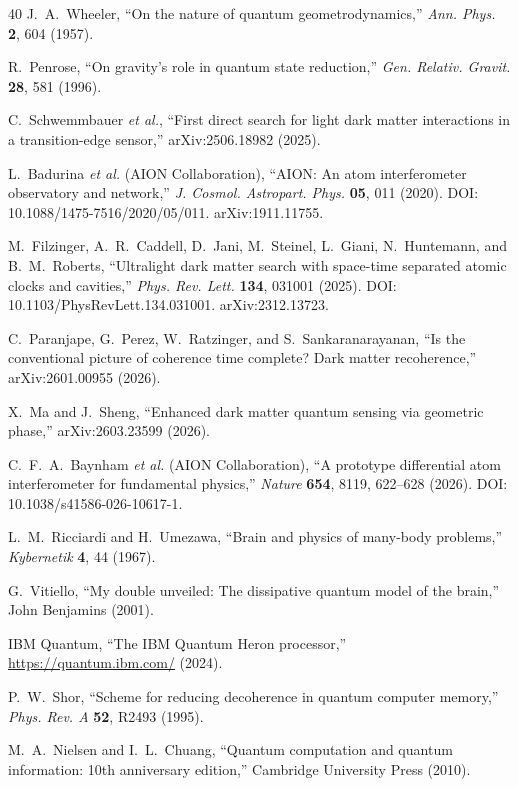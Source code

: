 ﻿\documentclass[12pt,a4paper]{article}
\begin{document}
\begin{thebibliography}{40}
J.~A.~Wheeler,
``On the nature of quantum geometrodynamics,''
\textit{Ann. Phys.} \textbf{2}, 604 (1957).

R.~Penrose,
``On gravity's role in quantum state reduction,''
\textit{Gen. Relativ. Gravit.} \textbf{28}, 581 (1996).

C.~Schwemmbauer \textit{et al.},
``First direct search for light dark matter interactions in a transition-edge sensor,''
arXiv:2506.18982 (2025).

L.~Badurina \textit{et al.} (AION Collaboration),
``AION: An atom interferometer observatory and network,''
\textit{J. Cosmol. Astropart. Phys.} \textbf{05}, 011 (2020).
DOI: 10.1088/1475-7516/2020/05/011. arXiv:1911.11755.

M.~Filzinger, A.~R.~Caddell, D.~Jani, M.~Steinel, L.~Giani, N.~Huntemann, and B.~M.~Roberts,
``Ultralight dark matter search with space-time separated atomic clocks and cavities,''
\textit{Phys. Rev. Lett.} \textbf{134}, 031001 (2025).
DOI: 10.1103/PhysRevLett.134.031001. arXiv:2312.13723.

C.~Paranjape, G.~Perez, W.~Ratzinger, and S.~Sankaranarayanan,
``Is the conventional picture of coherence time complete? Dark matter recoherence,''
arXiv:2601.00955 (2026).

X.~Ma and J.~Sheng,
``Enhanced dark matter quantum sensing via geometric phase,''
arXiv:2603.23599 (2026).

C.~F.~A.~Baynham \textit{et al.} (AION Collaboration),
``A prototype differential atom interferometer for fundamental physics,''
\textit{Nature} \textbf{654}, 8119, 622--628 (2026).
DOI: 10.1038/s41586-026-10617-1.

L.~M.~Ricciardi and H.~Umezawa,
``Brain and physics of many-body problems,''
\textit{Kybernetik} \textbf{4}, 44 (1967).

G.~Vitiello,
``My double unveiled: The dissipative quantum model of the brain,''
John Benjamins (2001).

IBM Quantum,
``The IBM Quantum Heron processor,''
\url{https://quantum.ibm.com/} (2024).

P.~W.~Shor,
``Scheme for reducing decoherence in quantum computer memory,''
\textit{Phys. Rev. A} \textbf{52}, R2493 (1995).

M.~A.~Nielsen and I.~L.~Chuang,
``Quantum computation and quantum information: 10th anniversary edition,''
Cambridge University Press (2010).


\end{thebibliography}
\end{document}
